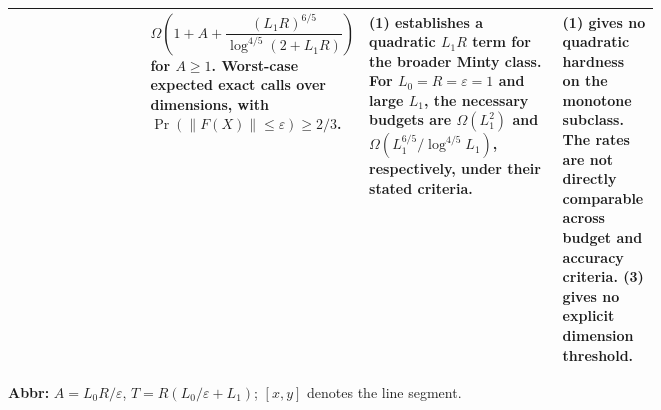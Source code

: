 \begin{table}[tp]
\begin{threeparttable}
\begin{tabularx}{\linewidth}{@{}>{\raggedright\arraybackslash}p{0.21\linewidth}>{\raggedright\arraybackslash}p{0.24\linewidth}>{\raggedright\arraybackslash}p{0.30\linewidth}>{\raggedright\arraybackslash}X@{}}
& $\Omega\!\left(1+A+\dfrac{(L_1R)^{6/5}}{\log^{4/5}(2+L_1R)}\right)$ for $A\ge1$. Worst-case expected exact calls over dimensions, with $\Pr(\|F(X)\|\le\varepsilon)\ge2/3$.
& \textbf{(1)} establishes a quadratic $L_1R$ term for the broader Minty class. For $L_0=R=\varepsilon=1$ and large $L_1$, the necessary budgets are $\Omega(L_1^2)$ and $\Omega(L_1^{6/5}/\log^{4/5} L_1)$, respectively, under their stated criteria.
& \textbf{(1)} gives no quadratic hardness on the monotone subclass. The rates are not directly comparable across budget and accuracy criteria. \textbf{(3)} gives no explicit dimension threshold. \\
\bottomrule
\end{tabularx}
\begin{tablenotes}[flushleft]\footnotesize
\item[] \textbf{Abbr:} $A=L_0R/\varepsilon$, $T=R(L_0/\varepsilon+L_1)$; $[x,y]$ denotes the line segment.
\end{tablenotes}
\end{threeparttable}
\end{table}
